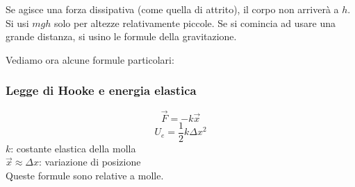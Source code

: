 \begin{center}
\end{center}
Se agisce una forza dissipativa (come quella di attrito), il corpo non arriverà a $h$.\\
Si usi $mgh$ solo per altezze relativamente piccole. Se si comincia ad usare una grande distanza, si
usino le formule della gravitazione.

Vediamo ora alcune formule particolari:
\subsubsection{Legge di Hooke e energia elastica}
\begin{equation*}
\vec{F} = -k\vec{x}
\end{equation*}
\begin{equation*}
U_e = \frac{1}{2}k\Delta x^2
\end{equation*}
$k$: costante elastica della molla\\
$\vec{x} \approx \Delta x$: variazione di posizione\\[\baselineskip]
Queste formule sono relative a molle.\\

